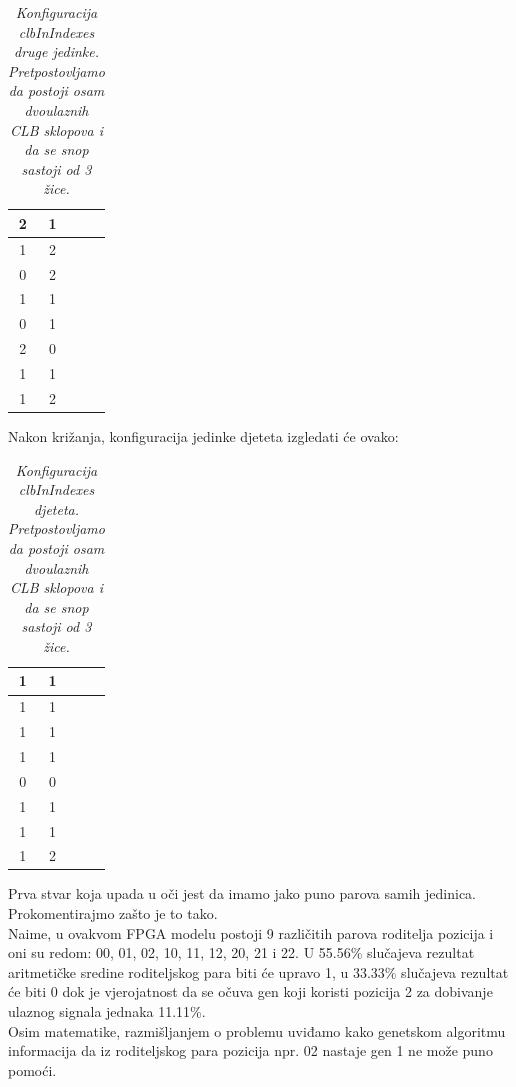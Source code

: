 \documentclass[times, utf8, zavrsni]{fer}
\begin{document}
\begin{table}[H]
	\caption{\emph{Konfiguracija \emph{clbInIndexes} druge jedinke. Pretpostovljamo da postoji osam dvoulaznih CLB sklopova i da se snop sastoji od 3 žice. }}
	\label{chromoClbIndex2}
	\centering
	\begin{tabular}{|c|c|c|c|} \hline
		2 & 1 \\ \hline
		1 & 2 \\ \hline
		0 & 2 \\ \hline
		1 & 1 \\ \hline
		0 & 1 \\ \hline
		2 & 0 \\ \hline
		1 & 1 \\ \hline
		1 & 2 \\ \hline
	\end{tabular}
\end{table} 

Nakon križanja, konfiguracija jedinke djeteta izgledati će ovako:

\begin{table}[H]
	\caption{\emph{Konfiguracija \emph{clbInIndexes} djeteta. Pretpostovljamo da postoji osam dvoulaznih CLB sklopova i da se snop sastoji od 3 žice. }}
	\label{chromoClbIndexChild}
	\centering
	\begin{tabular}{|c|c|c|c|} \hline
		1 & 1 \\ \hline
		1 & 1 \\ \hline
		1 & 1 \\ \hline
		1 & 1 \\ \hline
		0 & 0 \\ \hline
		1 & 1 \\ \hline
		1 & 1 \\ \hline
		1 & 2 \\ \hline
	\end{tabular}
\end{table}
 
Prva stvar koja upada u oči jest da imamo jako puno parova samih jedinica. Prokomentirajmo zašto je to tako. \\
Naime, u ovakvom FPGA modelu postoji 9 različitih parova roditelja pozicija i oni su redom: 00, 01, 02, 10, 11, 12, 20, 21 i 22. U 55.56\% slučajeva rezultat aritmetičke sredine roditeljskog para biti će upravo 1, u 33.33\% slučajeva rezultat će biti 0 dok je vjerojatnost da se očuva gen koji koristi pozicija 2 za dobivanje ulaznog signala jednaka 11.11\%. \\ 
Osim matematike, razmišljanjem o problemu uviđamo kako genetskom algoritmu informacija da iz roditeljskog para pozicija npr. 02 nastaje gen 1 ne može puno pomoći. 
\end{document}
